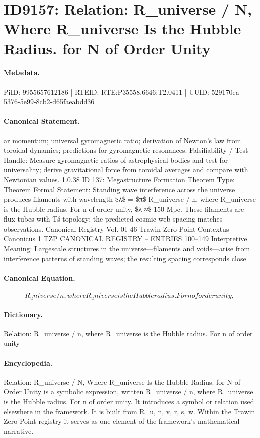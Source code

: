 \section*{ID9157: Relation: R\_universe / N, Where R\_universe Is the Hubble Radius. for N of Order Unity}
\paragraph{Metadata.}
PiID: 9955657612186 | RTEID: RTE:P35558.6646:T2.0411 | UUID: 529170ea-5376-5e99-8cb2-d65faeabdd36

\paragraph{Canonical Statement.}
ar momentum; universal gyromagnetic ratio; derivation of Newton’s law from toroidal dynamics; predictions for gyromagnetic resonances. Falsifiability / Test Handle: Measure gyromagnetic ratios of astrophysical bodies and test for universality; derive gravitational force from toroidal averages and compare with Newtonian values. 1.0.38 ID 137: Megastructure Formation Theorem Type: Theorem Formal Statement: Standing wave interference across the universe produces filaments with wavelength \$λ\$ = \$π\$ R\_universe / n, where R\_universe is the Hubble radius. For n of order unity, \$λ ≈\$ 150 Mpc. These filaments are flux tubes with Tš topology; the predicted cosmic web spacing matches observations. Canonical Registry Vol. 01 46 Trawin Zero Point Contextus Canonicus 1 TZP CANONICAL REGISTRY – ENTRIES 100–149 Interpretive Meaning: Largescale structures in the universe—filaments and voids—arise from interference patterns of standing waves; the resulting spacing corresponds close

\paragraph{Canonical Equation.}
\[
R_universe / n, where R_universe is the Hubble radius. For n of order unity,
\]

\paragraph{Dictionary.}
Relation: R\_universe / n, where R\_universe is the Hubble radius. For n of order unity

\paragraph{Encyclopedia.}
Relation: R\_universe / N, Where R\_universe Is the Hubble Radius. for N of Order Unity is a symbolic expression, written R\_universe / n, where R\_universe is the Hubble radius. For n of order unity. It introduces a symbol or relation used elsewhere in the framework. It is built from R\_u, n, v, r, s, w. Within the Trawin Zero Point registry it serves as one element of the framework's mathematical narrative.

